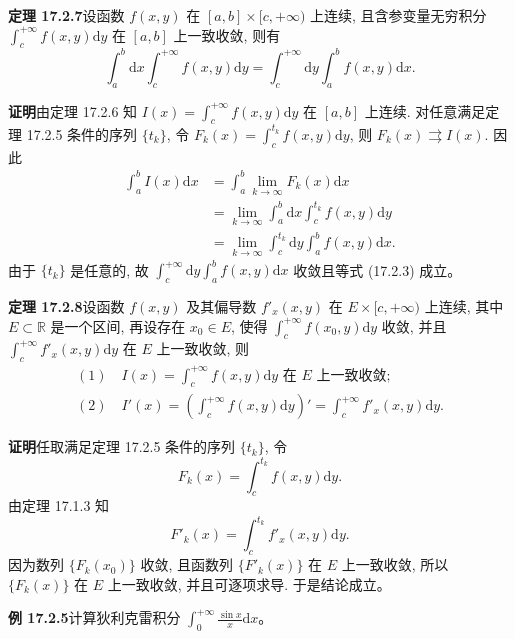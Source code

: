\documentclass[UTF8,12pt,a4paper,fontset=fandol]{ctexart}
\begin{document}
\noindent\textbf{定理 17.2.7}\quad 设函数 $f(x,y)$ 在 $[a,b]\times[c,+\infty)$ 上连续, 且含参变量无穷积分 $\int_c^{+\infty}f(x,y)\mathrm dy$ 在 $[a,b]$ 上一致收敛, 则有
\begin{equation}
  \int_a^b\mathrm dx\int_c^{+\infty}f(x,y)\mathrm dy
  =
  \int_c^{+\infty}\mathrm dy\int_a^b f(x,y)\mathrm dx.
  \tag{17.2.3}
\end{equation}

\noindent\textbf{证明}\quad 由定理 17.2.6 知 $I(x)=\int_c^{+\infty}f(x,y)\mathrm dy$ 在 $[a,b]$ 上连续. 对任意满足定理 17.2.5 条件的序列 $\{t_k\}$, 令 $F_k(x)=\int_c^{t_k}f(x,y)\mathrm dy$, 则 $F_k(x)\rightrightarrows I(x)$. 因此
\[
\begin{aligned}
  \int_a^b I(x)\mathrm dx
  &=\int_a^b\lim_{k\to\infty}F_k(x)\mathrm dx\\
  &=\lim_{k\to\infty}\int_a^b\mathrm dx\int_c^{t_k}f(x,y)\mathrm dy\\
  &=\lim_{k\to\infty}\int_c^{t_k}\mathrm dy\int_a^b f(x,y)\mathrm dx.
\end{aligned}
\]
由于 $\{t_k\}$ 是任意的, 故 $\int_c^{+\infty}\mathrm dy\int_a^b f(x,y)\mathrm dx$ 收敛且等式 (17.2.3) 成立。

\noindent\textbf{定理 17.2.8}\quad 设函数 $f(x,y)$ 及其偏导数 $f'_x(x,y)$ 在 $E\times[c,+\infty)$ 上连续, 其中 $E\subset\mathbb R$ 是一个区间, 再设存在 $x_0\in E$, 使得 $\int_c^{+\infty}f(x_0,y)\mathrm dy$ 收敛, 并且 $\int_c^{+\infty}f'_x(x,y)\mathrm dy$ 在 $E$ 上一致收敛, 则
\[
\begin{gathered}
  (1)\quad I(x)=\int_c^{+\infty}f(x,y)\mathrm dy \text{ 在 } E \text{ 上一致收敛};\\
  (2)\quad I'(x)=\left(\int_c^{+\infty}f(x,y)\mathrm dy\right)'
  =\int_c^{+\infty}f'_x(x,y)\mathrm dy.
\end{gathered}
\]

\noindent\textbf{证明}\quad 任取满足定理 17.2.5 条件的序列 $\{t_k\}$, 令
\[
  F_k(x)=\int_c^{t_k}f(x,y)\mathrm dy.
\]
由定理 17.1.3 知
\[
  F'_k(x)=\int_c^{t_k}f'_x(x,y)\mathrm dy.
\]
因为数列 $\{F_k(x_0)\}$ 收敛, 且函数列 $\{F'_k(x)\}$ 在 $E$ 上一致收敛, 所以 $\{F_k(x)\}$ 在 $E$ 上一致收敛, 并且可逐项求导. 于是结论成立。

\noindent\textbf{例 17.2.5}\quad 计算狄利克雷积分 $\int_0^{+\infty}\frac{\sin x}{x}\mathrm dx$。
\end{document}
